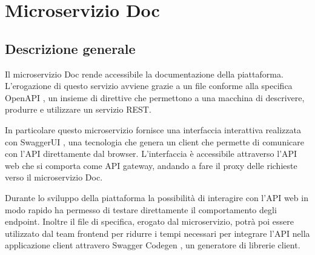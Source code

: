 \section{Microservizio Doc}
\subsection{Descrizione generale}
Il microservizio Doc rende accessibile la documentazione della piattaforma.
L'erogazione di questo servizio avviene grazie a un file conforme alla specifica OpenAPI \cite{openAPI},
un insieme di direttive che permettono a una macchina di descrivere, produrre e utilizzare
un servizio REST.

In particolare questo microservizio fornisce una interfaccia interattiva realizzata con
SwaggerUI \cite{SwaggerUI}, una tecnologia che genera un client che permette di comunicare con l'API direttamente
dal browser. L'interfaccia è accessibile attraverso l'API web che si comporta
come API gateway, andando a fare il proxy delle richieste verso il microservizio Doc.

Durante lo sviluppo della piattaforma la possibilità di interagire con l'API web in modo rapido ha permesso
di testare direttamente il comportamento degli endpoint. Inoltre il file di specifica, erogato dal microservizio,
potrà poi essere utilizzato dal team frontend per ridurre i tempi necessari per integrare l'API nella applicazione client
attravero Swagger Codegen \cite{SwaggerCodegen}, un generatore di librerie client.